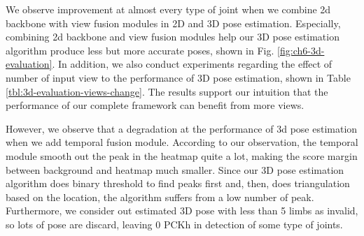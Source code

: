 We observe improvement at almost every type of joint when we combine 2d backbone with view fusion modules in 2D and 3D pose estimation. Especially, combining 2d backbone and view fusion modules help our 3D pose estimation algorithm produce less but more accurate poses, shown in Fig. \ref{fig:ch6-3d-evaluation}. In addition, we also conduct experiments regarding the effect of number of input view to the performance of 3D pose estimation, shown in Table \ref{tbl:3d-evaluation-views-change}. The results support our intuition that the performance of our complete framework can benefit from more views. 

However, we observe that a degradation at the performance of 3d pose estimation when we add temporal fusion module. According to our observation, the temporal module smooth out the peak in the heatmap quite a lot, making the score margin between background and heatmap much smaller. Since our 3D pose estimation algorithm does binary threshold to find peaks first and, then, does triangulation based on the location, the algorithm suffers from a low number of peak. Furthermore, we consider out estimated 3D pose with less than 5 limbs as invalid, so lots of pose are discard, leaving 0 PCKh in detection of some type of joints.